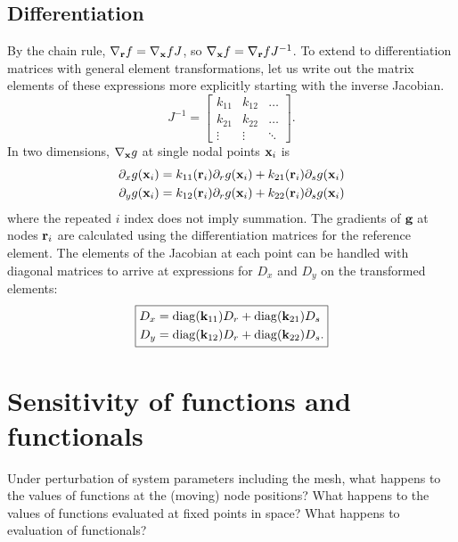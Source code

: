 \subsection{Differentiation}
By the chain rule, $\nabla_{\textbf{r}} f = \nabla_{\textbf{x}}f J$, so $\nabla_{\textbf{x}}f = \nabla_{\textbf{r}} f J^{-1}$.  To extend to differentiation matrices with general element transformations, let us write out the matrix elements of these expressions more explicitly starting with the inverse Jacobian.
%
\begin{equation}
J^{-1} = \begin{bmatrix}
k_{11} & k_{12} & \hdots \\
k_{21} & k_{22} & \hdots \\
\vdots & \vdots & \ddots
\end{bmatrix}.
\end{equation}
%
In two dimensions, $\nabla_{\textbf{x}} g$ at single nodal points $\textbf{x}_i$ is
%
\begin{equation}
\begin{aligned}
\partial_x g(\textbf{x}_i) = k_{11}(\textbf{r}_i) \partial_r g(\textbf{x}_i) + k_{21}(\textbf{r}_i) \partial_s g(\textbf{x}_i) \\
\partial_y g(\textbf{x}_i) = k_{12}(\textbf{r}_i) \partial_r g(\textbf{x}_i) + k_{22}(\textbf{r}_i) \partial_s g(\textbf{x}_i)
\end{aligned}
\end{equation}
%
where the repeated $i$ index does not imply summation.  The gradients of $\textbf{g}$ at nodes $\textbf{r}_i$ are calculated using the differentiation matrices for the reference element.  The elements of the Jacobian at each point can be handled with diagonal matrices to arrive at expressions for $D_x$ and $D_y$ on the transformed elements:
%
\begin{equation}
\boxed{
\begin{aligned}
D_x &= \mathrm{diag}(\textbf{k}_{11}) D_r + \mathrm{diag}(\textbf{k}_{21}) D_s \\
D_y &= \mathrm{diag}(\textbf{k}_{12}) D_r + \mathrm{diag}(\textbf{k}_{22}) D_s .
\end{aligned}
}
\label{eqn:partialDerivatives}
\end{equation}


\section{Sensitivity of functions and functionals}

Under perturbation of system parameters including the mesh, what happens to the values of functions at the (moving) node positions?  What happens to the values of functions evaluated at fixed points in space?  What happens to evaluation of functionals?

